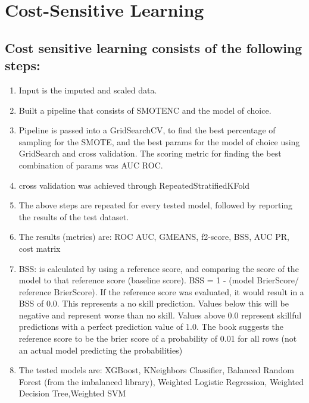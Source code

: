 \documentclass{article}
\begin{document}
\section{Cost-Sensitive Learning}
\subsection{Cost sensitive learning consists of the following steps:}
\begin{enumerate}
    \item Input is the imputed and scaled data.
    \item Built a pipeline that consists of SMOTENC and the model of choice.
    \item Pipeline is passed into a GridSearchCV, to find the best percentage of sampling for the SMOTE, and the best params for the model of choice using GridSearch and cross validation. The scoring metric for finding the best combination of params was AUC ROC.
    \item cross validation was achieved through RepeatedStratifiedKFold%
    \item The above steps are repeated for every tested model, followed by reporting the results of the test dataset.
    \item The results (metrics) are: ROC AUC, GMEANS, f2-score, BSS, AUC PR, cost matrix
    \item BSS: is calculated by using a reference score, and comparing the score of the model to that reference score (baseline score). BSS = 1 - (model BrierScore/ reference BrierScore). If the reference score was evaluated, it would result in a BSS of 0.0. This represents a no skill prediction. Values below this will be negative and represent worse than no skill. Values above 0.0 represent skillful predictions with a perfect prediction value of 1.0. The book suggests the reference score to be the brier score of a probability of 0.01 for all rows (not an actual model predicting the probabilities)
    \item The tested models are: XGBoost, KNeighbors Classifier, Balanced Random Forest (from the imbalanced library), Weighted Logistic Regression, Weighted Decision Tree,Weighted SVM
\end{enumerate}
\end{document}
